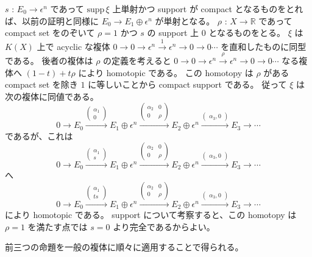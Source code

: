 \documentclass[dvipdfmx]{jsarticle}
\begin{document}
\begin{Proof}
\itemprof
  \(s\) : \(E_0 \to \epsilon^n\) であって \(\text{supp} \, \xi\) 上単射かつ support が compact となるものをとれば、以前の証明と同様に \(E_0 \to E_1 \oplus \epsilon^n\) が単射となる。
  \(\rho\) : \(X \to \mathbb{R}\) であって compact set をのぞいて \(\rho = 1\) かつ \(s\) の support 上 \(0\) となるものをとる。
  \(\xi\) は \(K(X)\) 上で acyclic な複体 \(0 \to 0 \to \epsilon^n \overset{1}{\to} \epsilon^n \to 0 \to 0 \cdots\) を直和したものに同型である。
  後者の複体は \(\rho\) の定義を考えると \(0 \to 0 \to \epsilon^n \overset{\rho}{\to} \epsilon^n \to 0 \to 0 \cdots\) なる複体へ \((1 - t) + t \rho\) により homotopic である。
  この homotopy は \(\rho\) がある compact set を除き \(1\) に等しいことから compact support である。
  従って \(\xi\) は次の複体に同値である。
  \[0 \to E_0 \overset{
    \begin{pmatrix}
      \alpha_1 \\
      0
    \end{pmatrix}
  }{\to} E_1 \oplus \epsilon^n \overset{
    \begin{pmatrix}
      \alpha_2 & 0 \\
      0 & \rho
    \end{pmatrix}
  }{\to} E_2 \oplus \epsilon^n \overset{
    \begin{pmatrix}
      \alpha_3 , 0
    \end{pmatrix}
  }{\to} E_3 \to \cdots\]
  であるが、これは
  \[0 \to E_0 \overset{
    \begin{pmatrix}
      \alpha_1 \\
      s
    \end{pmatrix}
  }{\to} E_1 \oplus \epsilon^n \overset{
    \begin{pmatrix}
      \alpha_2 & 0 \\
      0 & \rho
    \end{pmatrix}
  }{\to} E_2 \oplus \epsilon^n \overset{
    \begin{pmatrix}
      \alpha_3 , 0
    \end{pmatrix}
  }{\to} E_3 \to \cdots\]
  へ
  \[0 \to E_0 \overset{
    \begin{pmatrix}
      \alpha_1 \\
      t s
    \end{pmatrix}
  }{\to} E_1 \oplus \epsilon^n \overset{
    \begin{pmatrix}
      \alpha_2 & 0 \\
      0 & \rho
    \end{pmatrix}
  }{\to} E_2 \oplus \epsilon^n \overset{
    \begin{pmatrix}
      \alpha_3 , 0
    \end{pmatrix}
  }{\to} E_3 \to \cdots\]
  により homotopic である。
  support について考察すると、この homotopy は \(\rho = 1\) を満たす点では \(s = 0\) より完全であるからよい。
\end{Proof}

\begin{Proof}
\itemprof
  前三つの命題を一般の複体に順々に適用することで得られる。
\end{Proof}
\end{document}
